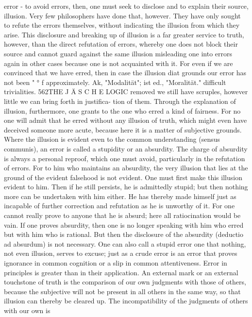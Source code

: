 error - to avoid errors, then, one must seek to disclose and to explain
their source, illusion. Very few philosophers have done that, however.
They have only sought to refute the errors themselves, without indicating
the illusion from which they arise. This disclosure and breaking up of
illusion is a far greater service to truth, however, than the direct refutation
of errors, whereby one does not block their source and cannot guard
against the same illusion misleading one into errors again in other cases
because one is not acquainted with it. For even if we are convinced that we
have erred, then in case the illusion diat grounds our error has not been
"
°
f
approximately.
Ak, "Modalität"; ist ed., "Moralität."
difficult trivialities.
562THE J Ä S C H E LOGIC
removed we still have scruples, however little we can bring forth in justifica-
tion of them.
Through the explanation of illusion, furthermore, one grants to the one
who erred a kind of fairness. For no one will admit that he erred without
any illusion of truth, which might even have deceived someone more
acute, because here it is a matter of subjective grounds.
Where the illusion is evident even to the common understanding (sensus
communis), an error is called a stupidity or an absurdity. The charge of
absurdity is always a personal reproof, which one must avoid, particularly
in the refutation of errors.
For to him who maintains an absurdity, the very illusion that lies at the
ground of the evident falsehood is not evident. One must first make this
illusion evident to him. Then if he still persists, he is admittedly stupid;
but then nothing more can be undertaken with him either. He has thereby
made himself just as incapable of further correction and refutation as he is
unworthy of it. For one cannot really prove to anyone that he is absurd;
here all ratiocination would be vain. If one proves absurdity, then one is no
longer speaking with him who erred but with him who is rational. But then
the disclosure of the absurdity (deductio ad absurdum) is not necessary.
One can also call a stupid error one that nothing, not even illusion, serves
to excuse; just as a crude error is an error that proves ignorance in common
cognition or a slip in common attentiveness.
Error in principles is greater than in their application.
An external mark or an external touchstone of truth is the comparison of
our own judgments with those of others, because the subjective will not be
present in all others in the same way, so that illusion can thereby be
cleared up. The incompatibility of the judgments of others with our own is
